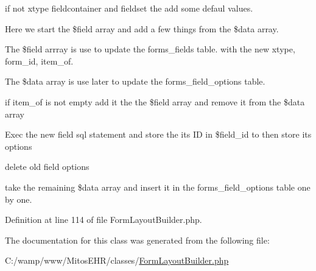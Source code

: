 if not xtype fieldcontainer and fieldset the add some defaul values.

\-Here we start the \$field array and add a few things from the \$data array.

\-The \$field arrray is use to update the forms\-\_\-fields table. with the new xtype, form\-\_\-id, item\-\_\-of.

\-The \$data array is use later to update the forms\-\_\-field\-\_\-options table.

if item\-\_\-of is not empty add it the the \$field array and remove it from the \$data array

\-Exec the new field sql statement and store the its \-I\-D in \$field\-\_\-id to then store its options

delete old field options

take the remaining \$data array and insert it in the forms\-\_\-field\-\_\-options table one by one.

\-Definition at line 114 of file \-Form\-Layout\-Builder.\-php.




\-The documentation for this class was generated from the following file\-:\begin{DoxyCompactItemize}
\item 
\-C\-:/wamp/www/\-Mitos\-E\-H\-R/classes/\hyperlink{_form_layout_builder_8php}{\-Form\-Layout\-Builder.\-php}\end{DoxyCompactItemize}
